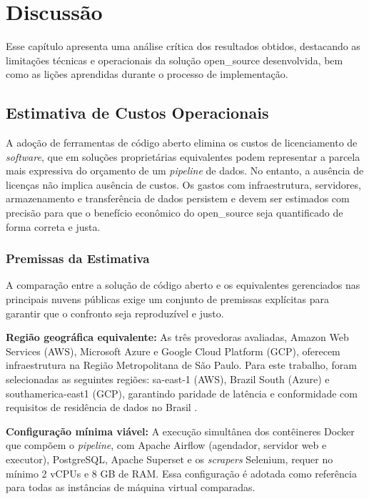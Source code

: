 \label{sec:discussao}

\chapter{Discussão}

Esse capítulo apresenta uma análise crítica dos resultados obtidos, destacando as limitações técnicas e operacionais da solução \acs{open_source} desenvolvida, bem como as lições aprendidas durante o processo de implementação.

\section{Estimativa de Custos Operacionais}

A adoção de ferramentas de código aberto elimina os custos de licenciamento de
\textit{software}, que em soluções proprietárias equivalentes podem representar a parcela
mais expressiva do orçamento de um \textit{pipeline} de dados. No entanto, a ausência de
licenças não implica ausência de custos. Os gastos com infraestrutura, servidores,
armazenamento e transferência de dados persistem e devem ser estimados com precisão
para que o benefício econômico do \acs{open_source} seja quantificado de forma correta e justa.

\subsection{Premissas da Estimativa}

A comparação entre a solução de código aberto e os equivalentes gerenciados nas
principais nuvens públicas exige um conjunto de premissas explícitas para garantir
que o confronto seja reproduzível e justo.

\textbf{Região geográfica equivalente:} As três provedoras avaliadas,
Amazon Web Services (AWS), Microsoft Azure e Google Cloud Platform (GCP),
oferecem infraestrutura na Região Metropolitana de São Paulo. Para este trabalho,
foram selecionadas as seguintes regiões: sa-east-1 (AWS),
Brazil South (Azure) e southamerica-east1 (GCP), garantindo
paridade de latência e conformidade com requisitos de residência de dados no
Brasil \cite[]{aws2026pricing, azure2026pricing, gcp2026pricing}.

\textbf{Configuração mínima viável:} A execução simultânea dos contêineres Docker
que compõem o \textit{pipeline}, com Apache Airflow (agendador, servidor web e
executor), PostgreSQL, Apache Superset e os \textit{scrapers} Selenium, requer
no mínimo 2 vCPUs e 8 GB de RAM. Essa configuração é adotada como referência para
todas as instâncias de máquina virtual comparadas. 

